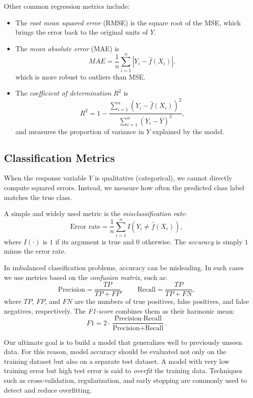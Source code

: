 Other common regression metrics include:

\begin{itemize}
    \item The \emph{root mean squared error} (RMSE) is the square root of the MSE, which brings the error back to the original units of $Y$.
    \item The \emph{mean absolute error} (MAE) is 
    \[
    MAE = \frac{1}{n}\sum_{i=1}^n \left|Y_i - \hat{f}(X_i)\right|,
    \]
    which is more robust to outliers than MSE.
    \item The \emph{coefficient of determination} $R^2$ is
    \[
    R^2 = 1 - \frac{\sum_{i=1}^n (Y_i - \hat{f}(X_i))^2}{\sum_{i=1}^n (Y_i - \bar{Y})^2},
    \]
    and measures the proportion of variance in $Y$ explained by the model.
\end{itemize}

\subsection{Classification Metrics}

When the response variable $Y$ is qualitative (categorical), we cannot directly compute squared errors. Instead, we measure how often the predicted class label matches the true class.

A simple and widely used metric is the \emph{misclassification rate}:
\[
\text{Error rate} = \frac{1}{n} \sum_{i=1}^n I\!\left( Y_i \neq \hat{f}(X_i) \right),
\]
where $I(\cdot)$ is $1$ if its argument is true and $0$ otherwise.  
The \emph{accuracy} is simply $1$ minus the error rate.

In imbalanced classification problems, accuracy can be misleading.  
In such cases we use metrics based on the \emph{confusion matrix}, such as:
\[
\text{Precision} = \frac{TP}{TP+FP},\qquad
\text{Recall} = \frac{TP}{TP+FN},
\]
where $TP$, $FP$, and $FN$ are the numbers of true positives, false positives, and false negatives, respectively.  
The \emph{F1-score} combines them as their harmonic mean:
\[
F1 = 2\cdot \frac{\text{Precision}\cdot \text{Recall}}{\text{Precision}+\text{Recall}}.
\]

Our ultimate goal is to build a model that generalizes well to previously unseen data.  
For this reason, model accuracy should be evaluated not only on the training dataset but also on a separate test dataset. A model with very low training error but high test error is said to \emph{overfit} the training data.  
Techniques such as cross-validation, regularization, and early stopping are commonly used to detect and reduce overfitting.


